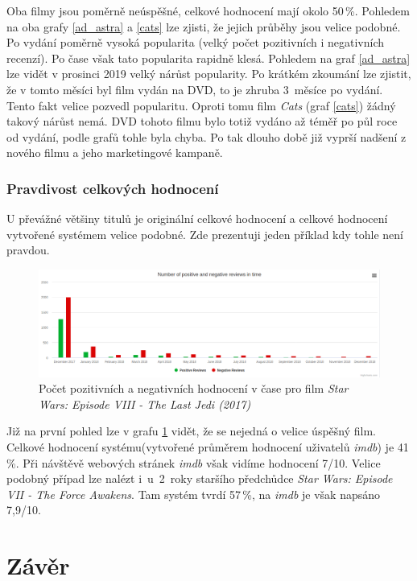 Oba filmy jsou poměrně neúspěšné, celkové hodnocení mají okolo 50\,\%. Pohledem na oba grafy \ref{ad_astra} a \ref{cats} lze zjisti, že jejich průběhy jsou velice podobné. Po vydání poměrně vysoká popularita (velký počet pozitivních i negativních recenzí). Po čase však tato popularita rapidně klesá. Pohledem na graf \ref{ad_astra} lze vidět v prosinci 2019 velký nárůst popularity. Po krátkém zkoumání lze zjistit, že v tomto měsíci byl film vydán na DVD, to je zhruba 3~měsíce po vydání. Tento fakt velice pozvedl popularitu. Oproti tomu film \emph{Cats} (graf \ref{cats}) žádný takový nárůst nemá. DVD tohoto filmu bylo totiž vydáno až téměř po půl roce od vydání, podle grafů tohle byla chyba. Po tak dlouho době již vyprší nadšení z nového filmu a jeho marketingové kampaně.  



\subsection{Pravdivost celkových hodnocení}
U převážné většiny titulů je originální celkové hodnocení a celkové hodnocení vytvořené systémem velice podobné. Zde prezentuji jeden příklad kdy tohle není pravdou. 

\begin{figure}[!htb]
\label{starwars}
\includegraphics[width=\textwidth]{last_jedi.png}
\caption{Počet pozitivních a negativních hodnocení v čase pro film \emph{Star Wars: Episode VIII - The Last Jedi (2017)}}
\end{figure}

Již na první pohled lze v grafu \ref{starwars} vidět, že se nejedná o velice úspěšný film. Celkové hodnocení systému(vytvořené průměrem hodnocení uživatelů \emph{imdb}) je 41\,\%. Při návštěvě webových stránek \emph{imdb} však vidíme hodnocení 7/10. Velice podobný případ lze nalézt i~u~2~roky staršího předchůdce \emph{Star Wars: Episode VII - The Force Awakens}. Tam systém tvrdí 57\,\%, na \emph{imdb} je však napsáno 7,9/10.



\chapter{Závěr}
\label{zaver}

